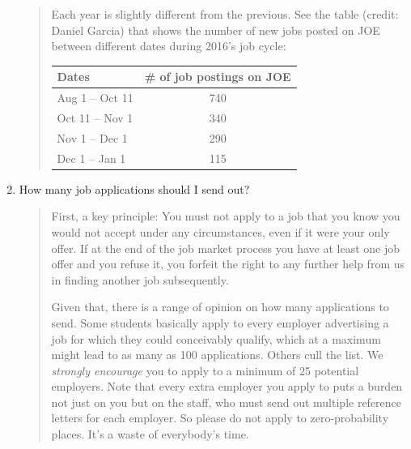 \documentclass{\classes/econtex}
\providecommand\phantomsection{}
\begin{document}
\begin{enumerate}
  \begin{quote}
    Each year is slightly different from the previous. See the table (credit: Daniel Garcia) 
    that shows the number of new jobs posted on JOE between different dates 
    during 2016's job cycle:
    \ifdvi\phantomsection\hypertarget{JobPostDates}{}\fi
    \begin{table}[h]
      \centering
      \begin{tabular}{|l|c|}
        \hline
        Dates                   & \# of job postings on JOE \\ \hline
        Aug 1 -- Oct 11   & 740                       \\ \hline
        Oct 11 -- Nov 1 & 340                       \\ \hline
        Nov 1 -- Dec 1 & 290                       \\ \hline
        Dec 1 -- Jan 1  & 115                       \\ \hline
      \end{tabular}
    \end{table}
  \end{quote}

\item  {} 
  How many job applications should I send out?

  \begin{quote}
    First, a key principle: You must not apply to a job that you know you would not
    accept under any circumstances, even if it were your only offer.  If
    at the end of the job market process you have at least one job offer
    and you refuse it, you forfeit the right to any further help from us
    in finding another job subsequently.  %

    Given that, there is a range of opinion on how many applications to send.  Some students basically apply to every employer advertising a job for which they could conceivably qualify, which at a maximum might lead to as many as 100 applications.  Others cull the list.  We \textit{strongly encourage} you to apply to a minimum of 25 potential employers.  Note that every extra employer you apply to puts a burden not just on you but on the staff, who must send out multiple reference letters for each employer.  So please do not apply to zero-probability places.  It's a waste of everybody's time.


\end{quote}
\end{enumerate}
\end{document}
